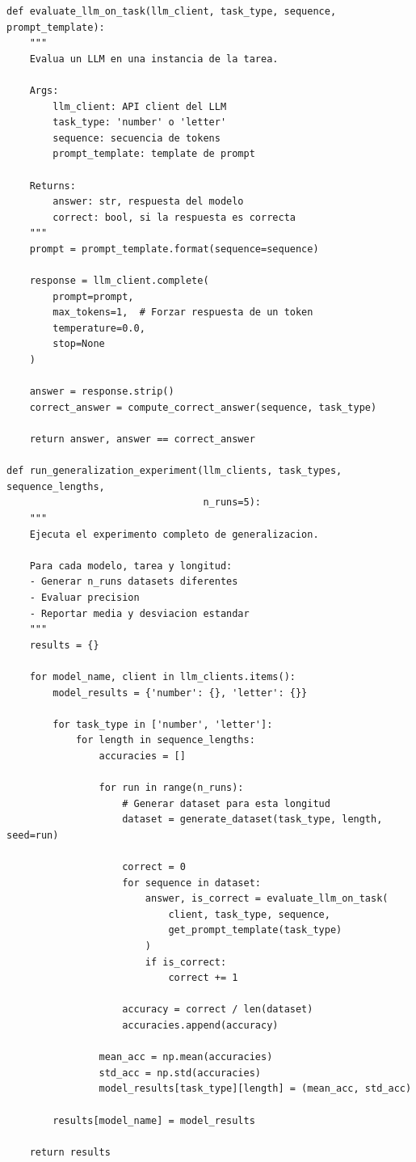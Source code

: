 \documentclass[12pt,a4paper]{report}
\begin{document}
\begin{lstlisting}
def evaluate_llm_on_task(llm_client, task_type, sequence, prompt_template):
    """
    Evalua un LLM en una instancia de la tarea.
    
    Args:
        llm_client: API client del LLM
        task_type: 'number' o 'letter'
        sequence: secuencia de tokens
        prompt_template: template de prompt
    
    Returns:
        answer: str, respuesta del modelo
        correct: bool, si la respuesta es correcta
    """
    prompt = prompt_template.format(sequence=sequence)
    
    response = llm_client.complete(
        prompt=prompt,
        max_tokens=1,  # Forzar respuesta de un token
        temperature=0.0,
        stop=None
    )
    
    answer = response.strip()
    correct_answer = compute_correct_answer(sequence, task_type)
    
    return answer, answer == correct_answer

def run_generalization_experiment(llm_clients, task_types, sequence_lengths,
                                  n_runs=5):
    """
    Ejecuta el experimento completo de generalizacion.
    
    Para cada modelo, tarea y longitud:
    - Generar n_runs datasets diferentes
    - Evaluar precision
    - Reportar media y desviacion estandar
    """
    results = {}
    
    for model_name, client in llm_clients.items():
        model_results = {'number': {}, 'letter': {}}
        
        for task_type in ['number', 'letter']:
            for length in sequence_lengths:
                accuracies = []
                
                for run in range(n_runs):
                    # Generar dataset para esta longitud
                    dataset = generate_dataset(task_type, length, seed=run)
                    
                    correct = 0
                    for sequence in dataset:
                        answer, is_correct = evaluate_llm_on_task(
                            client, task_type, sequence,
                            get_prompt_template(task_type)
                        )
                        if is_correct:
                            correct += 1
                    
                    accuracy = correct / len(dataset)
                    accuracies.append(accuracy)
                
                mean_acc = np.mean(accuracies)
                std_acc = np.std(accuracies)
                model_results[task_type][length] = (mean_acc, std_acc)
        
        results[model_name] = model_results
    
    return results
\end{lstlisting}
\end{document}
